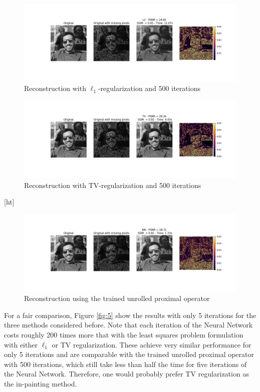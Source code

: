 \documentclass{article}
\begin{document}
\begin{enumerate}[label=2.\arabic*]
    \begin{figure}[ht]
        \centering
        \includegraphics[width=\textwidth]{img/reconstruction_l1.png}
        \caption{Reconstruction with $\ell_1$-regularization and 500 iterations}
        \label{fig:rec_l1_500}
    \end{figure}
    \begin{figure}[ht]
        \centering
        \includegraphics[width=\textwidth]{img/reconstruction_tv.png}
        \caption{Reconstruction with TV-regularization and 500 iterations}
        \label{fig:rec_tv_500}
    \end{figure}[ht]
    \begin{figure}
        \centering
        \includegraphics[width=\textwidth]{img/reconstruction_nn.png}
        \caption{Reconstruction using the trained unrolled proximal operator}
        \label{fig:rec_nn}
    \end{figure}
    
    For a fair comparison, Figure \ref{fig:5} show the results with only 5 iterations for the three methods considered before. Note that each iteration of the Neural Network costs roughly 200 times more that with the least squares problem formulation with either $\ell_1$ or TV regularization. These achieve very similar performance for only 5 iterations and are comparable with the trained unrolled proximal operator with 500 iterations, which still take less than half the time for five iterations of the Neural Network. Therefore, one would probably prefer TV regularization as the in-painting method.
    

\end{enumerate}
\end{document}
